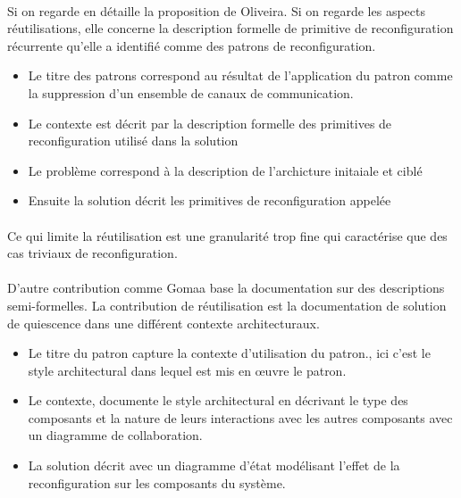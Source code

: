 \paragraph{} 
Si on regarde en détaille la proposition de Oliveira. 
%
Si on regarde les aspects réutilisations, elle concerne la description
formelle de primitive de reconfiguration récurrente qu'elle a
identifié comme des patrons de reconfiguration.  

\begin{itemize}
\item Le titre des patrons correspond au résultat de l'application du patron
comme la suppression d'un ensemble de canaux de communication. 
\item Le contexte est décrit par la description formelle des
primitives de reconfiguration utilisé dans la solution
\item Le problème correspond à la description de l'archicture
initaiale et ciblé
\item Ensuite la solution décrit les primitives de reconfiguration
appelée
\end{itemize}

\paragraph{}
Ce qui limite la réutilisation est une granularité trop fine qui
caractérise que des cas triviaux de reconfiguration. 

%
\paragraph{}
D'autre contribution comme Gomaa base la documentation sur des
descriptions semi-formelles. La contribution de réutilisation est la
documentation de solution de quiescence dans une différent contexte
architecturaux. 

\begin{itemize}
\item Le titre du patron capture la contexte d'utilisation du patron., ici
c'est le style architectural dans lequel est mis en \oe{}uvre le
patron. 
\item Le contexte, documente le style architectural en décrivant le
type des composants et la nature de leurs interactions avec les autres
composants avec un diagramme de collaboration. 
\item La solution décrit avec un diagramme d'état modélisant l'effet
de la reconfiguration sur les composants du système. 
\end{itemize}


